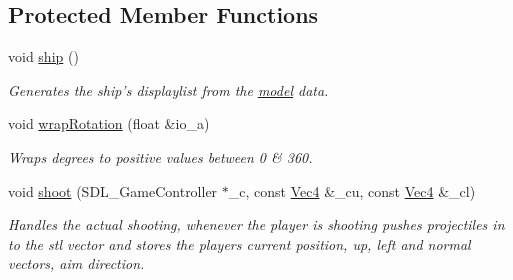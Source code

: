 \subsection*{Protected Member Functions}
\begin{DoxyCompactItemize}
\item 
\hypertarget{classPlayer_a13cd7bb4538e7bb8d7c9bd47e84039b7}{
void \hyperlink{classPlayer_a13cd7bb4538e7bb8d7c9bd47e84039b7}{ship} ()}
\label{classPlayer_a13cd7bb4538e7bb8d7c9bd47e84039b7}

\begin{DoxyCompactList}\small\item\em Generates the ship's displaylist from the \hyperlink{structmodel}{model} data. \item\end{DoxyCompactList}\item 
void \hyperlink{classPlayer_ad13442ce6259aacf5e02ea1a76826ca9}{wrapRotation} (float \&io\_\-a)
\begin{DoxyCompactList}\small\item\em Wraps degrees to positive values between 0 \& 360. \item\end{DoxyCompactList}\item 
void \hyperlink{classPlayer_acf17b0c4c70aae116360032f44f50012}{shoot} (SDL\_\-GameController $\ast$\_\-c, const \hyperlink{classVec4}{Vec4} \&\_\-cu, const \hyperlink{classVec4}{Vec4} \&\_\-cl)
\begin{DoxyCompactList}\small\item\em Handles the actual shooting, whenever the player is shooting pushes projectiles in to the stl vector and stores the players current position, up, left and normal vectors, aim direction. \item\end{DoxyCompactList}\end{DoxyCompactItemize}
